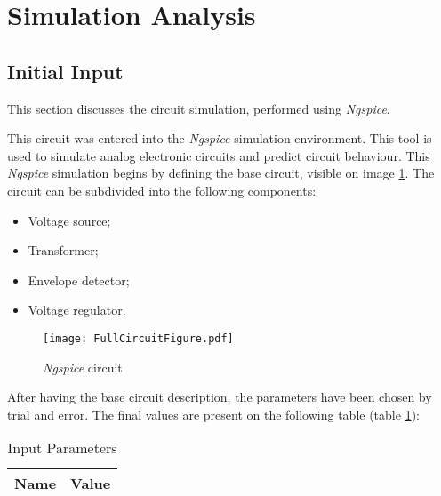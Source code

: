 \section{Simulation Analysis}
\label{sec:simulation}

\subsection{Initial Input}


\indent

This section discusses the circuit simulation, performed using {\it Ngspice}. 

This circuit was entered into the {\it Ngspice} simulation environment. This tool is used to simulate analog electronic circuits and predict circuit behaviour. 
This {\it Ngspice} simulation begins by defining the base circuit, visible on image \ref{fig:ngspiceCircuit}. The circuit can be subdivided into the following components:
 
\begin{itemize}
    \item Voltage source;
    \item Transformer;
    \item Envelope detector;
    \item Voltage regulator.
\end{itemize}

\begin{figure}[H]
    \centering
    \texttt{[image: FullCircuitFigure.pdf]}
    \caption{{\it Ngspice} circuit}
    \label{fig:ngspiceCircuit}
\end{figure}

After having the base circuit description, the parameters have been chosen by trial and error. The final values are present on the following table (table \ref{tab:InputNGS}):

\begin{table}[H]
  \centering
  \begin{tabular}{|l|r|}
    \hline    
    {\bf Name} & {\bf Value} \\ \hline
    
  \end{tabular}
  \caption{Input Parameters}
  \label{tab:InputNGS}
\end{table}

